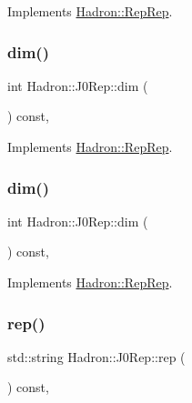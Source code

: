 Implements \mbox{\hyperlink{structHadron_1_1RepRep_a92c8802e5ed7afd7da43ccfd5b7cd92b}{Hadron\+::\+Rep\+Rep}}.

\mbox{\label{structHadron_1_1J0Rep_a99c9a3c8bac7e89e8f393fdd0cdd8c64}} 
\subsubsection{\texorpdfstring{dim()}{dim()}\hspace{0.1cm}{\footnotesize\ttfamily [4/5]}}
{\footnotesize\ttfamily int Hadron\+::\+J0\+Rep\+::dim (\begin{DoxyParamCaption}{ }\end{DoxyParamCaption}) const\hspace{0.3cm}{\ttfamily [inline]}, {\ttfamily [virtual]}}



Implements \mbox{\hyperlink{structHadron_1_1RepRep_a92c8802e5ed7afd7da43ccfd5b7cd92b}{Hadron\+::\+Rep\+Rep}}.

\mbox{\label{structHadron_1_1J0Rep_a99c9a3c8bac7e89e8f393fdd0cdd8c64}} 
\subsubsection{\texorpdfstring{dim()}{dim()}\hspace{0.1cm}{\footnotesize\ttfamily [5/5]}}
{\footnotesize\ttfamily int Hadron\+::\+J0\+Rep\+::dim (\begin{DoxyParamCaption}{ }\end{DoxyParamCaption}) const\hspace{0.3cm}{\ttfamily [inline]}, {\ttfamily [virtual]}}



Implements \mbox{\hyperlink{structHadron_1_1RepRep_a92c8802e5ed7afd7da43ccfd5b7cd92b}{Hadron\+::\+Rep\+Rep}}.

\mbox{\label{structHadron_1_1J0Rep_a357214188122dd0e69716a4f7ff098b1}} 
\subsubsection{\texorpdfstring{rep()}{rep()}\hspace{0.1cm}{\footnotesize\ttfamily [1/5]}}
{\footnotesize\ttfamily std\+::string Hadron\+::\+J0\+Rep\+::rep (\begin{DoxyParamCaption}{ }\end{DoxyParamCaption}) const\hspace{0.3cm}{\ttfamily [inline]}, {\ttfamily [virtual]}}



